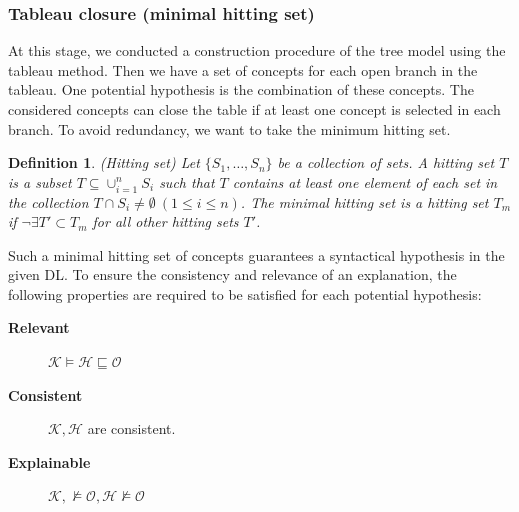 \documentclass{article}
\newtheorem{mydef}{Definition}
\begin{document}
\subsubsection{Tableau closure (minimal hitting set)}
At this stage, we conducted a construction procedure of the tree model using  the tableau method. Then we have a set of concepts for each open branch in the tableau.
One potential hypothesis is the combination of these concepts. The considered concepts can close the table if at least one concept is selected in each branch.
To avoid redundancy, we want to take the minimum hitting set. 
\begin{mydef}{(Hitting set)}
 Let $\{ S_1,\dots,S_n\}$ be a collection of sets. A hitting set  $T$ is a subset $T\subseteq \cup_{i=1}^{n} S_i$ such that $T$ contains at least one element
 of each set in the collection $T \cap S_i \neq \emptyset~(1\leq i\leq n)$.
 The minimal hitting set is a hitting set $T_m$ if  $\neg \exists T'\subset T_m$ for all other hitting sets $T'$.
\end{mydef}

Such a minimal hitting set of concepts guarantees a syntactical hypothesis in the given DL. 
To ensure the consistency and relevance of an explanation, the following properties are required to be satisfied for each potential hypothesis:
\begin{description}
 \item[\textbf{Relevant}] $\mathcal{K}\vDash \mathcal{H} \sqsubseteq \mathcal{O}$
 \item[\textbf{Consistent}] $\mathcal{K},\mathcal{H} $ are consistent.
 \item[\textbf{Explainable}] $\mathcal{K},\nvDash \mathcal{O}, \mathcal{H}   \nvDash \mathcal{O}$
\end{description}
\medskip
\end{document}
